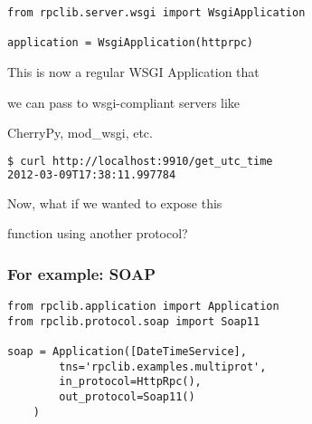 \documentclass{beamer}
\begin{document}
\begin{frame}[fragile]
 \begin{lstlisting}
from rpclib.server.wsgi import WsgiApplication

application = WsgiApplication(httprpc)
 \end{lstlisting}

  \begin{center}
    This is now a regular WSGI Application that

    \bigskip

    we can pass to wsgi-compliant servers like

    \bigskip

    CherryPy, mod\_wsgi, etc.
  \end{center}
  \pause
  \begin{lstlisting}[language=sh]
$ curl http://localhost:9910/get_utc_time
2012-03-09T17:38:11.997784
  \end{lstlisting}
\end{frame}

\begin{frame}
  \LARGE
  \begin{center}
    Now, what if we wanted to expose this

    \bigskip

    function using another protocol?
  \end{center}
\end{frame}

\begin{frame}[fragile]
  \frametitle{For example: SOAP}

  \begin{lstlisting}
from rpclib.application import Application
from rpclib.protocol.soap import Soap11

soap = Application([DateTimeService],
        tns='rpclib.examples.multiprot',
        in_protocol=HttpRpc(),
        out_protocol=Soap11()
    )
  \end{lstlisting}
\end{frame}
\end{document}
